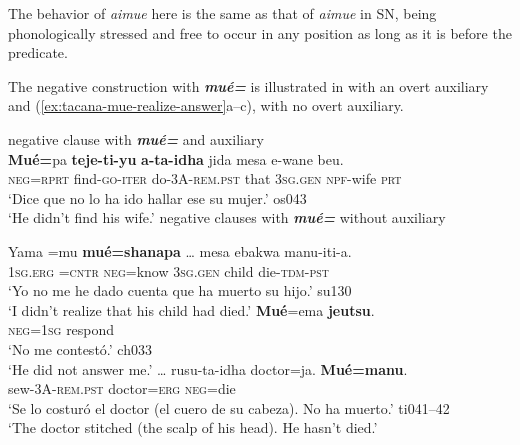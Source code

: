 \documentclass[output=paper]{langsci/langscibook}
\begin{document}
The behavior of \textit{aimue} here is the same as that of \textit{aimue} in SN, being phonologically stressed and free to occur in any position as long as it is before the predicate.

The negative construction with \textbf{\textit{mué=}} is illustrated in
 with an overt auxiliary and
(\ref{ex:tacana-mue-realize-answer}a--c), with no overt auxiliary.

\begin{exe}\ex \label{ex:tacana-mueaux}  negative clause with
\textbf{\textit{mué=}} and auxiliary\\
\gll  \textbf{Mué=}pa \textbf{teje-ti-yu} \textbf{a-ta-idha}
\makebox[0pt][l]{\raisebox{\baselineskip}{O}} jida mesa e-wane{\cb} beu.\\
 \textsc{neg=rprt}  find-\textsc{go-iter}  do\textsc{-3A-rem.pst}  that
 \textsc{3sg.gen}  \textsc{npf}-wife  \textsc{prt}\\
\glt `Dice que no lo ha ido hallar ese su mujer.' os043\\
`He didn't find his wife.'
\ex \label{ex:tacana-mue-realize-answer} negative clauses with
\textbf{\textit{mué=}} without auxiliary
\begin{xlist}
\ex\label{}
\gll  {}Yama  =mu
\textbf{mué=shanapa}
\ob\ldots{\cb} {\ob}mesa ebakwa{\cb} manu-iti-a.\\
\textsc{1sg.erg}  \textsc{=cntr}  \textsc{neg}=know {} 3\textsc{sg.gen}
child die-\textsc{tdm-pst}\\
\glt `Yo no me he dado cuenta que ha muerto su hijo.' su130\\
`I didn't realize that his child had died.'
\ex\label{ex:tacana-mue-answer}
\gll {}\textbf{Mué}=ema
\textbf{jeutsu}.\\
    \textsc{neg=1sg} respond\\
\glt `No me contestó.' ch033\\
`He did not answer me.'
\ex\label{ex:tacana-mue-doctor}
\gll  \ldots{} rusu-ta-idha doctor=ja.
\textbf{Mué=manu}.\\
{}    sew-3A\textsc{-rem.pst}  doctor=\textsc{erg}  \textsc{neg}=die\\
\glt `Se lo costuró el doctor (el cuero de su cabeza). No ha muerto.'
ti041--42\\
`The doctor stitched (the scalp of his head). He hasn't died.'
\end{xlist}\end{exe}
\end{document}
